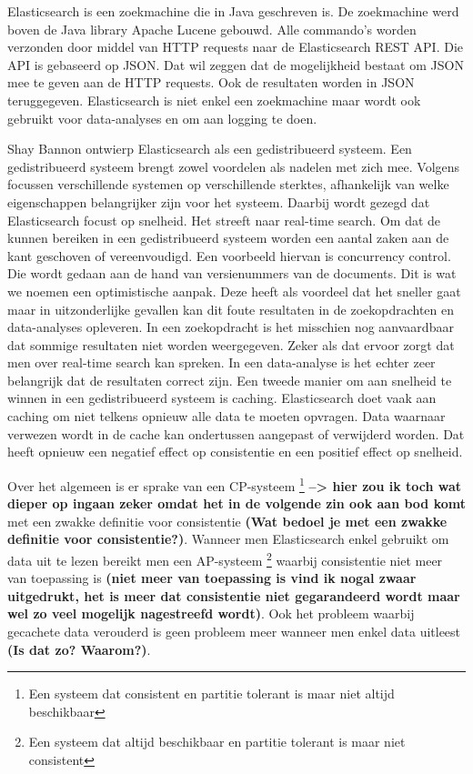 Elasticsearch is een zoekmachine die in Java geschreven is. De zoekmachine werd boven de Java library Apache Lucene gebouwd. Alle commando's worden verzonden door middel van HTTP requests naar de Elasticsearch REST API. Die API is gebaseerd op JSON. Dat wil zeggen dat de mogelijkheid bestaat om JSON mee te geven aan de HTTP requests. Ook de resultaten worden in JSON teruggegeven. Elasticsearch is niet enkel een zoekmachine maar wordt ook gebruikt voor data-analyses en om aan logging te doen. 

Shay Bannon ontwierp Elasticsearch als een gedistribueerd systeem. Een gedistribueerd systeem brengt zowel voordelen als nadelen met zich mee. Volgens \textcite{Brasetvik2013s} focussen verschillende systemen op verschillende sterktes, afhankelijk van welke eigenschappen belangrijker zijn voor het systeem. Daarbij wordt gezegd dat Elasticsearch focust op snelheid. Het streeft naar real-time search. Om dat de kunnen bereiken in een gedistribueerd systeem worden een aantal zaken aan de kant geschoven of vereenvoudigd. Een voorbeeld hiervan is concurrency control. Die wordt gedaan aan de hand van versienummers van de documents. Dit is wat we noemen een optimistische aanpak. Deze heeft als voordeel dat het sneller gaat maar in uitzonderlijke gevallen kan dit foute resultaten in de zoekopdrachten en data-analyses opleveren. In een zoekopdracht is het misschien nog aanvaardbaar dat sommige resultaten niet worden weergegeven. Zeker als dat ervoor zorgt dat men over real-time search kan spreken. In een data-analyse is het echter zeer belangrijk dat de resultaten correct zijn. Een tweede manier om aan snelheid te winnen in een gedistribueerd systeem is caching. Elasticsearch doet vaak aan caching om niet telkens opnieuw alle data te moeten opvragen. Data waarnaar verwezen wordt in de cache kan ondertussen aangepast of verwijderd worden. Dat heeft opnieuw een negatief effect op consistentie en een positief effect op snelheid.

Over het algemeen is er sprake van een CP-systeem \footnote{Een systeem dat consistent en partitie tolerant is maar niet altijd beschikbaar} \textbf{--> hier zou ik toch wat dieper op ingaan zeker omdat het in de volgende zin ook aan bod komt} met een zwakke definitie voor consistentie \textbf{(Wat bedoel je met een zwakke definitie voor consistentie?)}. Wanneer men Elasticsearch enkel gebruikt om data uit te lezen bereikt men een AP-systeem \footnote{Een systeem dat altijd beschikbaar en partitie tolerant is maar niet consistent} waarbij consistentie niet meer van toepassing is \textbf{(niet meer van toepassing is vind ik nogal zwaar uitgedrukt, het is meer dat consistentie niet gegarandeerd wordt maar wel zo veel mogelijk nagestreefd wordt)}. Ook het probleem waarbij gecachete data verouderd is geen probleem meer wanneer men enkel data uitleest \textbf{(Is dat zo? Waarom?)}.

